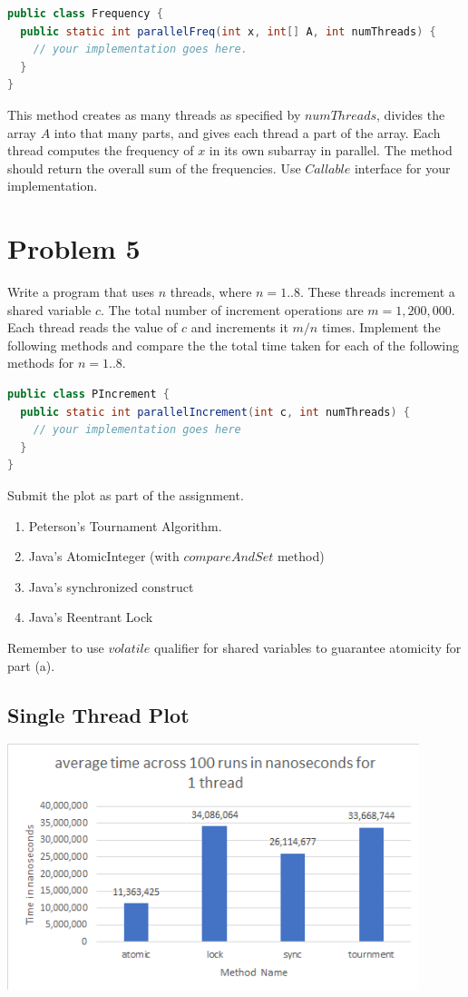 \documentclass{article}
\begin{document}
\begin{lstlisting}[language=Java]
public class Frequency {
  public static int parallelFreq(int x, int[] A, int numThreads) {
    // your implementation goes here.
  }
}
\end{lstlisting}

This method creates as many threads as specified by $numThreads$, divides the array $A$ into that many parts, and gives each thread a part of the array. Each thread computes the frequency of $x$ in its own subarray in parallel. The method should return the overall sum of the frequencies. Use $Callable$ interface for your implementation.

\pagebreak
\section{Problem 5}
Write a program that uses $n$ threads, where $n = 1..8$. These threads increment a shared variable $c$. The total number of increment operations are $m = 1, 200, 000$. Each thread reads the value of $c$ and increments it $m/n$ times. Implement the following methods and compare the the total time taken for each of
the following methods for $n = 1..8$.

\begin{lstlisting}[language=Java]
public class PIncrement {
  public static int parallelIncrement(int c, int numThreads) {
    // your implementation goes here
  }
}
\end{lstlisting}


Submit the plot as part of the assignment.

\begin{enumerate}[label=\alph*)]
  \item Peterson’s Tournament Algorithm.
  \item Java’s AtomicInteger (with $compareAndSet$ method)
  \item Java’s synchronized construct
  \item Java’s Reentrant Lock
\end{enumerate}

Remember to use $volatile$ qualifier for shared variables to guarantee
atomicity for part (a).

\subsection{Single Thread Plot}
\includegraphics[width=12cm]{1_thread}
\end{document}
